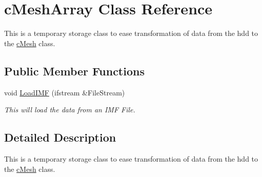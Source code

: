 \hypertarget{classc_mesh_array}{
\section{cMeshArray Class Reference}
\label{classc_mesh_array}
}


This is a temporary storage class to ease transformation of data from the hdd to the \hyperlink{classc_mesh}{cMesh} class.  


\subsection*{Public Member Functions}
\begin{DoxyCompactItemize}
\item 
\hypertarget{classc_mesh_array_adce4a1c4b77569227f23d1e4cc46b4bb}{
void \hyperlink{classc_mesh_array_adce4a1c4b77569227f23d1e4cc46b4bb}{LoadIMF} (ifstream \&FileStream)}
\label{classc_mesh_array_adce4a1c4b77569227f23d1e4cc46b4bb}

\begin{DoxyCompactList}\small\item\em This will load the data from an IMF File. \end{DoxyCompactList}\end{DoxyCompactItemize}


\subsection{Detailed Description}
This is a temporary storage class to ease transformation of data from the hdd to the \hyperlink{classc_mesh}{cMesh} class. 